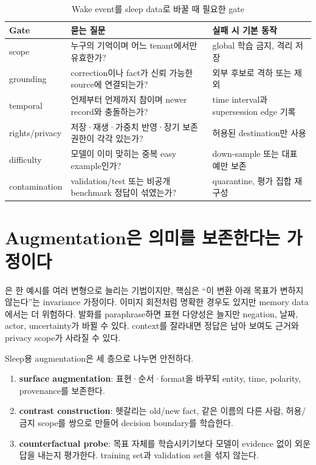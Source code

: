 \begin{table}[htbp]
\centering
\caption{Wake event를 sleep data로 바꿀 때 필요한 gate}
\label{tab:bg-data-gates}
\small
\begin{tabularx}{\textwidth}{p{} X X}
\toprule
Gate & 묻는 질문 & 실패 시 기본 동작 \\
\midrule
scope & 누구의 기억이며 어느 tenant에서만 유효한가? & global 학습 금지, 격리 저장 \\
grounding & correction이나 fact가 신뢰 가능한 source에 연결되는가? & 외부 후보로 격하 또는 제외 \\
temporal & 언제부터 언제까지 참이며 newer record와 충돌하는가? & time interval과 supersession edge 기록 \\
rights/privacy & 저장·재생·가중치 반영·장기 보존 권한이 각각 있는가? & 허용된 destination만 사용 \\
difficulty & 모델이 이미 맞히는 중복 easy example인가? & down-sample 또는 대표 예만 보존 \\
contamination & validation/test 또는 비공개 benchmark 정답이 섞였는가? & quarantine, 평가 집합 재구성 \\
\bottomrule
\end{tabularx}
\end{table}

\section{Augmentation은 의미를 보존한다는 가정이다}

은 한 예시를 여러 변형으로 늘리는 기법이지만,
핵심은 ``이 변환 아래 목표가 변하지 않는다''는 invariance 가정이다. 이미지 회전처럼 명확한
경우도 있지만 memory data에서는 더 위험하다. 발화를 paraphrase하면 표현 다양성은 늘지만
negation, 날짜, actor, uncertainty가 바뀔 수 있다. context를 잘라내면 정답은 남아 보여도
근거와 privacy scope가 사라질 수 있다.

Sleep용 augmentation은 세 층으로 나누면 안전하다.

\begin{enumerate}
  \item \textbf{surface augmentation}: 표현·순서·format을 바꾸되 entity, time, polarity,
        provenance를 보존한다.
  \item \textbf{contrast construction}: 헷갈리는 old/new fact, 같은 이름의 다른 사람,
        허용/금지 scope를 쌍으로 만들어 decision boundary를 학습한다.
  \item \textbf{counterfactual probe}: 목표 자체를 학습시키기보다 모델이 evidence 없이
        외운 답을 내는지 평가한다. training set과 validation set을 섞지 않는다.
\end{enumerate}

